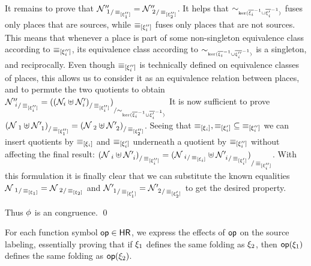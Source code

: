 \begin{proofE}
\begin{itemize}
      It remains to prove that
      ${\mathcal{N}''_{~1}}_{/\operatorname{{\equiv}}_{[\xi''_1]}} =
      {\mathcal{N}''_{~2}}_{/\operatorname{{\equiv}}_{[\xi''_2]}}$.  It helps that
      $\sim_{\scriptscriptstyle{\mathrm{ker}(\overline{\xi_i}^{-1}\cup\overline{\xi'_i}^{-1})}}$ fuses only places that are
      sources, while $\operatorname{{\equiv}}_{[\xi''_i]}$ fuses only places that
      are not sources.  This means that whenever a place is part of
      some non-singleton equivalence class according to
      $\operatorname{{\equiv}}_{[\xi''_i]}$, its equivalence class according to
      $\sim_{\scriptscriptstyle{\mathrm{ker}(\overline{\xi_i}^{-1}\cup\overline{\xi''_i}^{-1})}}$ is a singleton, and
      reciprocally.  Even though $\operatorname{{\equiv}}_{[\xi''_i]}$ is
      technically defined on equivalence classes of places, this
      allows us to consider it as an equivalence relation between
      places, and to permute the two quotients to obtain
      ${\mathcal{N}''_{~i}}_{/\operatorname{{\equiv}}_{[\xi''_i]}} =
      {(({\mathcal{N}_i \uplus
          \mathcal{N}'_i)}_{/\operatorname{{\equiv}}_{[\xi''_i]}})}_{/\sim_{\scriptscriptstyle{\mathrm{ker}(\overline{\xi_i}^{-1}\cup\overline{\xi'_i}^{-1})}}}$
      It is now sufficient to prove
      ${(\mathcal{N}_{~1}\uplus\mathcal{N}'_{~1})}_{/\operatorname{{\equiv}}_{[\xi''_1]}}
      =
      {(\mathcal{N}_{~2}\uplus\mathcal{N}'_{~2})}_{/\operatorname{{\equiv}}_{[\xi''_2]}}$.
      Seeing that $\operatorname{{\equiv}}_{[\xi_i]},\operatorname{{\equiv}}_{[\xi'_i]}
      \subseteq \operatorname{{\equiv}}_{[\xi''_i]}$ we can insert quotients by
      $\operatorname{{\equiv}}_{[\xi_i]}$ and $\operatorname{{\equiv}}_{[\xi'_i]}$ underneath a
      quotient by $\operatorname{{\equiv}}_{[\xi''_i]}$ without affecting the final
      result:
      ${(\mathcal{N}_{~i}\uplus\mathcal{N}'_{~i})}_{/\operatorname{{\equiv}}_{[\xi''_i]}}
      = {({\mathcal{N}_{~i}}_{/\operatorname{{\equiv}}_{[\xi_i]}} \uplus
        {\mathcal{N}'_{~i}}_{/\operatorname{{\equiv}}_{[\xi'_i]}})}_{/\operatorname{{\equiv}}_{[\xi''_i]}}$.
      With this formulation it is finally clear that we can substitute
      the known equalities ${\mathcal{N}_{~1}}_{/\operatorname{{\equiv}}_{[\xi_1]}}
      = {\mathcal{N}_{~2}}_{/\operatorname{{\equiv}}_{[\xi_2]}}$ and
      ${\mathcal{N}'_{~1}}_{/\operatorname{{\equiv}}_{[\xi'_1]}} =
      {\mathcal{N}'_{~2}}_{/\operatorname{{\equiv}}_{[\xi'_2]}}$ to get the desired
      property.
  \end{itemize}
  Thus $\phi$ is an \hrtext{} congruence.
  \qed
\end{proofE}
\begin{proofSketch}
  For each function symbol $\mathsf{op} \in \mathsf{HR}$, we express the effects
  of $\mathsf{op}$ on the source labeling, essentially proving that if
  $\xi_1$ defines the same folding as $\xi_2$,
  then $\mathsf{op}(\xi_1)$ defines the same folding as $\mathsf{op}(\xi_2)$.
\end{proofSketch}


